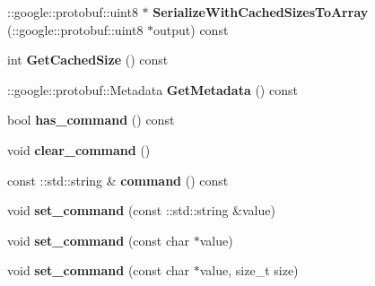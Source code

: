 \begin{DoxyCompactItemize}
\item 
\hypertarget{classmessaging_1_1RequestMessage_ae4f3186bcbc25dcf4c8b3241642dcdbb}{
::google::protobuf::uint8 $\ast$ {\bfseries SerializeWithCachedSizesToArray} (::google::protobuf::uint8 $\ast$output) const }
\label{classmessaging_1_1RequestMessage_ae4f3186bcbc25dcf4c8b3241642dcdbb}

\item 
\hypertarget{classmessaging_1_1RequestMessage_a1b156b4dc4f856376d1376861096c829}{
int {\bfseries GetCachedSize} () const }
\label{classmessaging_1_1RequestMessage_a1b156b4dc4f856376d1376861096c829}

\item 
\hypertarget{classmessaging_1_1RequestMessage_a00d6eeb34990997c363494e3b5d6fb26}{
::google::protobuf::Metadata {\bfseries GetMetadata} () const }
\label{classmessaging_1_1RequestMessage_a00d6eeb34990997c363494e3b5d6fb26}

\item 
\hypertarget{classmessaging_1_1RequestMessage_ad797d501aea6cc6db87b114ba1bd28b1}{
bool {\bfseries has\_\-command} () const }
\label{classmessaging_1_1RequestMessage_ad797d501aea6cc6db87b114ba1bd28b1}

\item 
\hypertarget{classmessaging_1_1RequestMessage_afa8ca59bd22a7fab3848224fe5bb2d7e}{
void {\bfseries clear\_\-command} ()}
\label{classmessaging_1_1RequestMessage_afa8ca59bd22a7fab3848224fe5bb2d7e}

\item 
\hypertarget{classmessaging_1_1RequestMessage_a1a4c684e33145f49257817e8e2d0c096}{
const ::std::string \& {\bfseries command} () const }
\label{classmessaging_1_1RequestMessage_a1a4c684e33145f49257817e8e2d0c096}

\item 
\hypertarget{classmessaging_1_1RequestMessage_a0a54cf196827d180f906c4ef4a6cebfa}{
void {\bfseries set\_\-command} (const ::std::string \&value)}
\label{classmessaging_1_1RequestMessage_a0a54cf196827d180f906c4ef4a6cebfa}

\item 
\hypertarget{classmessaging_1_1RequestMessage_a7e61a06625d579067dd561749ccd9d4d}{
void {\bfseries set\_\-command} (const char $\ast$value)}
\label{classmessaging_1_1RequestMessage_a7e61a06625d579067dd561749ccd9d4d}

\item 
\hypertarget{classmessaging_1_1RequestMessage_a485f242035c9b88218d75986e5d5cef6}{
void {\bfseries set\_\-command} (const char $\ast$value, size\_\-t size)}
\label{classmessaging_1_1RequestMessage_a485f242035c9b88218d75986e5d5cef6}


\end{DoxyCompactItemize}
